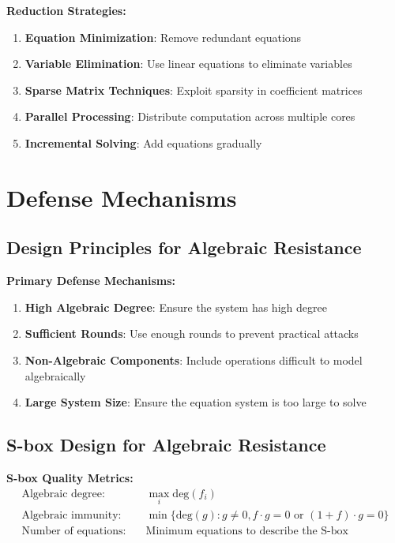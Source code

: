 \documentclass[12pt,a4paper]{article}
\newcommand{\degree}{\text{deg}}
\begin{document}
\begin{algorithmbox}[title=Practical Optimizations]
\textbf{Reduction Strategies:}
\begin{enumerate}
    \item \textbf{Equation Minimization}: Remove redundant equations
    \item \textbf{Variable Elimination}: Use linear equations to eliminate variables
    \item \textbf{Sparse Matrix Techniques}: Exploit sparsity in coefficient matrices
    \item \textbf{Parallel Processing}: Distribute computation across multiple cores
    \item \textbf{Incremental Solving}: Add equations gradually
\end{enumerate}
\end{algorithmbox}

\section{Defense Mechanisms}

\subsection{Design Principles for Algebraic Resistance}

\begin{defenseBox}[title=High-Level Defense Strategies]
\textbf{Primary Defense Mechanisms:}
\begin{enumerate}
    \item \textbf{High Algebraic Degree}: Ensure the system has high degree
    \item \textbf{Sufficient Rounds}: Use enough rounds to prevent practical attacks
    \item \textbf{Non-Algebraic Components}: Include operations difficult to model algebraically
    \item \textbf{Large System Size}: Ensure the equation system is too large to solve
\end{enumerate}
\end{defenseBox}

\subsection{S-box Design for Algebraic Resistance}

\begin{mathematicsbox}
\textbf{S-box Quality Metrics:}
\begin{align}
\text{Algebraic degree:} \quad & \max_i \degree(f_i) \\
\text{Algebraic immunity:} \quad & \min\{\degree(g) : g \neq 0, f \cdot g = 0 \text{ or } (1+f) \cdot g = 0\} \\
\text{Number of equations:} \quad & \text{Minimum equations to describe the S-box}
\end{align}
\end{mathematicsbox}
\end{document}
